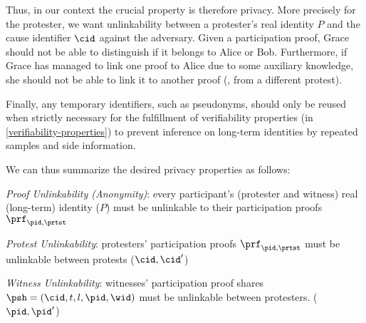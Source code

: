 Thus, in our context the crucial property is therefore privacy.
More precisely for the protester, we want unlinkability between a protester's real identity \(P\) and the cause identifier \(\cid\) against the adversary.
Given a participation proof, Grace should not be able to distinguish if it belongs to Alice or Bob.
Furthermore, if Grace has managed to link one proof to Alice due to some auxiliary knowledge, she should not be able to link it to another proof (\eg, from a different protest).

Finally, any temporary identifiers, such as pseudonyms, should only be reused 
when strictly necessary for the fulfillment of verifiability properties (in 
\cref{verifiability-properties}) to prevent inference on long-term identities 
by repeated samples and side information.

We can thus summarize the desired privacy properties as follows:
\begin{requirements}[P]
\item\label{ProofUnlink} \emph{Proof Unlinkability (Anonymity)}: every 
  participant's (protester and witness) real (long-term) identity (\(P\)) must 
  be unlinkable to their participation proofs \(\prf_{\pid, \prtst}\)
\item\label{ProtestUnlink} \emph{Protest Unlinkability}: protesters' participation proofs \(\prf_{\pid, \prtst}\) must be unlinkable between protests (\(\cid, \cid' \))
\item\label{WitnessUnlink}\emph{Witness Unlinkability}:  witnesses' participation proof shares \(\psh = (\cid, t, l, \pid,\wid)\) must be unlinkable between protesters. (\(\pid, \pid' \))
\end{requirements}


